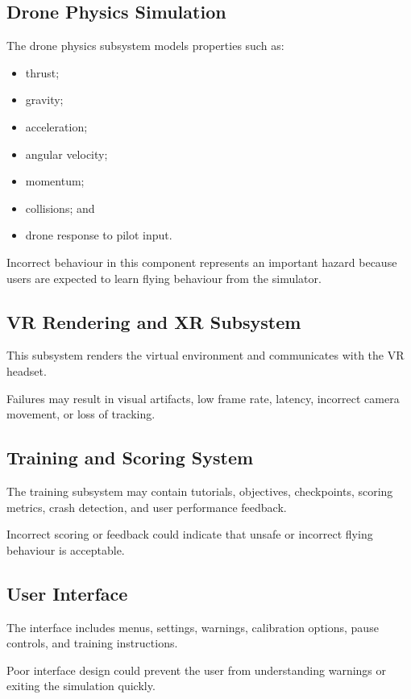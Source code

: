 \documentclass{article}
\begin{document}
\subsection{Drone Physics Simulation}

The drone physics subsystem models properties such as:

\begin{itemize}
    \item thrust;
    \item gravity;
    \item acceleration;
    \item angular velocity;
    \item momentum;
    \item collisions; and
    \item drone response to pilot input.
\end{itemize}

Incorrect behaviour in this component represents an important hazard because
users are expected to learn flying behaviour from the simulator.

\subsection{VR Rendering and XR Subsystem}

This subsystem renders the virtual environment and communicates with the VR
headset.

Failures may result in visual artifacts, low frame rate, latency, incorrect
camera movement, or loss of tracking.

\subsection{Training and Scoring System}

The training subsystem may contain tutorials, objectives, checkpoints, scoring
metrics, crash detection, and user performance feedback.

Incorrect scoring or feedback could indicate that unsafe or incorrect flying
behaviour is acceptable.

\subsection{User Interface}

The interface includes menus, settings, warnings, calibration options, pause
controls, and training instructions.

Poor interface design could prevent the user from understanding warnings or
exiting the simulation quickly.
\end{document}
